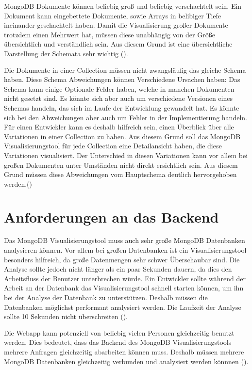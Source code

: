 MongoDB Dokumente können beliebig groß und beliebig verschachtelt sein.
Ein Dokument kann eingebettete Dokumente, sowie Arrays in belibiger Tiefe ineinander geschachtelt haben.
Damit die Visualisierung großer Dokumente trotzdem einen Mehrwert hat, müssen diese unabhängig von der Größe übersichtlich und verständlich sein.
Aus diesem Grund ist eine übersichtliche Darstellung der Schemata sehr wichtig ().

Die Dokumente in einer Collection müssen nicht zwangsläufig das gleiche Schema haben.
Diese Schema Abweichungen können Verschiedene Ursachen haben:
Das Schema kann einige Optionale Felder haben, welche in manchen Dokumenten nicht gesetzt sind.
Es könnte sich aber auch um verschiedene Versionen eines Schemas handeln, das sich im Laufe der Entwicklung gewandelt hat.
Es könnte sich bei den Abweichungen aber auch um Fehler in der Implementierung handeln.
Für einen Entwickler kann es deshalb hilfreich sein, einen Überblick über alle Variationen in einer Collection zu haben.
Aus diesem Grund soll das MongoDB Visualisierungstool für jede Collection eine Detailansicht haben, die diese Variationen visualisiert.
Der Unterschied in diesen Variationen kann vor allem bei großen Dokumenten unter Umständen nicht direkt ersichtlich sein.
Aus diesem Grund müssen diese Abweichungen vom Hauptschema deutlich hervorgehoben werden.()

\section{Anforderungen an das Backend}
\label{sec:anf_backend}

Das MongoDB Visualisierungstool muss auch sehr große MongoDB Datenbanken analysieren können.
Vor allem bei großen Datenbanken ist ein Visualisierungstool besonders hilfreich, da große Datenmengen sehr schwer Überschaubar sind.
Die Analyse sollte jedoch nicht länger als ein paar Sekunden dauern, da dies den Arbeitsfluss der Benutzer unterbrechen würde.
Ein Entwickler sollte während der Arbeit an der Datenbank das Visualisierungstool schnell starten können, um ihn bei der Analyse der Datenbank zu unterstützen.
Deshalb müssen die Datenbanken möglichst performant analysiert werden.
Die Laufzeit der Analyse sollte 10 Sekunden nicht überschreiten ().

Die Webapp kann potenziell von beliebig vielen Personen gleichzeitig benutzt werden.
Dies bedeutet, dass das Backend des MongoDB Visualisierungstools mehrere Anfragen gleichzeitig abarbeiten können muss.
Deshalb müssen mehrere MongoDB Datenbanken gleichzeitig verbunden und analysiert werden könnnen ().

